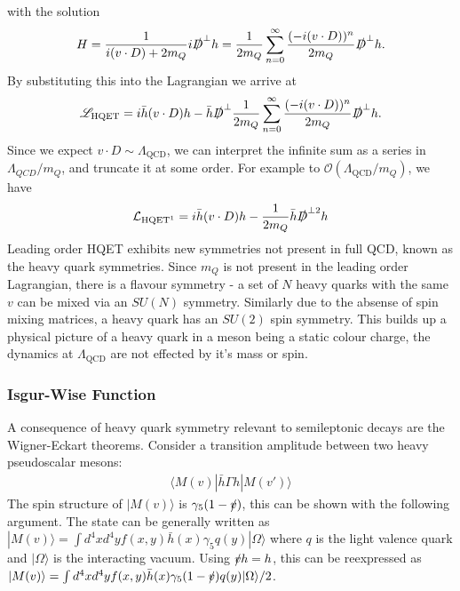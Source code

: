 with the solution
\begin{align}
	H = {1\over i(v\cdot D) + 2m_Q} i\slashed{D}^{\perp} h = {1\over 2m_Q}\sum_{n=0}^{\infty} {(-i(v\cdot D))^n\over 2m_Q} \slashed{D}^{\perp} h.
\end{align}
By substituting this into the Lagrangian we arrive at
\begin{align}
	\mathscr{L}_{\text{HQET}} = i \bar{h} (v\cdot D) h - \bar{h} \slashed{D}^{\perp} {1\over 2m_Q}\sum_{n=0}^{\infty} {(-i(v\cdot D))^n\over 2m_Q} \slashed{D}^{\perp} h.
\end{align}
Since we expect $v\cdot D \sim \Lambda_{\text{QCD}}$, we can interpret the infinite sum as a series in $\Lambda_{QCD}/m_Q$, and truncate it at some order. For example to $\mathcal{O}(\Lambda_{\text{QCD}}/m_Q)$, we have
\begin{align}
	\mathcal{L}_{\text{HQET}^1} = i \bar{h} (v\cdot D) h - {1\over 2m_Q} \bar{h} \slashed{D}^{\perp 2} h
	\label{eq:HQET1}
\end{align}
 Leading order HQET exhibits new symmetries not present in full QCD, known as the heavy quark symmetries. Since $m_Q$ is not present in the leading order Lagrangian, there is a flavour symmetry - a set of $N$ heavy quarks with the same $v$ can be mixed via an $SU(N)$ symmetry. Similarly due to the absense of spin mixing matrices, a heavy quark has an $SU(2)$ spin symmetry. This builds up a physical picture of a heavy quark in a meson being a static colour charge, the dynamics at $\Lambda_{\text{QCD}}$ are not effected by it's mass or spin.

\subsubsection{Isgur-Wise Function}
\label{sec:isgurwise}

A consequence of heavy quark symmetry relevant to semileptonic decays are the Wigner-Eckart theorems. Consider a transition amplitude between two heavy pseudoscalar mesons:
\begin{align}
  \langle M(v) | \bar{h} \Gamma h | M(v') \rangle
\end{align}
The spin structure of $| M(v) \rangle$ is $\gamma_5 (1-\slashed{v})$, this can be shown with the following argument. The state can be generally written as $| M(v) \rangle = \int d^4x d^4y f(x,y) \bar{h}(x) \gamma_5 q(y) | \Omega \rangle$ where $q$ is the light valence quark and $|\Omega\rangle$ is the interacting vacuum. Using $\slashed{v} h = h$, this can be reexpressed as $| M(v) \rangle = \int d^4x d^4y f(x,y) \bar{h}(x) \gamma_5 (1-\slashed{v}) q(y) | \Omega \rangle /2$. %

